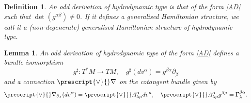 \documentclass[11pt,a4paper]{amsart}
\numberwithin{equation}{section}
\newtheorem{definition}[theorem]{Definition}
\newtheorem{lemma}[theorem]{Lemma}
\newcommand{\qa}{\alpha}
\newcommand{\qb}{\beta}
\newcommand{\qp}{\partial}
\newcommand{\Qg}{\Gamma}
\newcommand{\ql}{\lambda}
\numberwithin{equation}{section}
\begin{document}
\begin{definition}
  An odd derivation of hydrodynamic type is that of the form \eqref{AD} such that 
  $\det(g^{\qa\qb})\neq 0$. If it defines a generalised Hamiltonian structure, we call it a (non-degenerate) generalised Hamiltonian structure of hydrodynamic type.
\end{definition}


\begin{lemma}
  An odd derivation of hydrodynamic type of the form \eqref{AD} defines a bundle isomorphism
  \[
  g^\sharp\colon T^*M\to TM,\quad g^\sharp(dv^\qa) = g^{\qb\qa}\qp_\qb
  \]
  and a connection $\prescript{\vee}{}\nabla$ on the cotangent bundle given by 
  \[
  \prescript{\vee}{}\nabla_{\qp_\ql}(dv^\qa) = \prescript{\vee}{}A^\qa_{\ql\mu} dv^\mu,\quad \prescript{\vee}{}A^\qa_{\ql\mu}g^{\qb\mu} = \Qg^{\qb\qa}_\ql.
  \]
\end{lemma}
\end{document}
